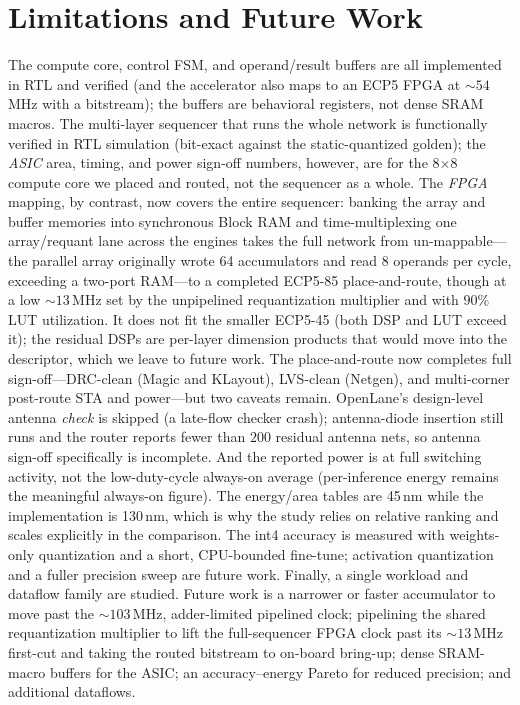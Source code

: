 \documentclass[conference]{IEEEtran}
\newcommand{\approxs}{\ensuremath{\sim}}
\begin{document}
\section{Limitations and Future Work}
The compute core, control FSM, and operand/result buffers are all implemented in
RTL and verified (and the accelerator also maps to an ECP5 FPGA at \approxs$54$\,MHz
with a bitstream); the buffers are behavioral registers, not dense SRAM macros.
The multi-layer sequencer that runs the whole network is functionally verified in
RTL simulation (bit-exact against the static-quantized golden); the \emph{ASIC}
area, timing, and power sign-off numbers, however, are for the 8$\times$8 compute
core we placed and routed, not the sequencer as a whole. The \emph{FPGA} mapping,
by contrast, now covers the entire sequencer: banking the array and buffer
memories into synchronous Block RAM and time-multiplexing one array/requant lane
across the engines takes the full network from un-mappable---the parallel array
originally wrote 64 accumulators and read 8 operands per cycle, exceeding a
two-port RAM---to a completed ECP5-85 place-and-route, though at a low
\approxs$13$\,MHz set by the unpipelined requantization multiplier and with $90\%$
LUT utilization. It does not fit the smaller ECP5-45 (both DSP and LUT exceed it);
the residual DSPs are per-layer dimension products that would move into the
descriptor, which we leave to future work.
The place-and-route now completes full sign-off---DRC-clean (Magic and KLayout),
LVS-clean (Netgen), and multi-corner post-route STA and power---but two caveats
remain. OpenLane's design-level antenna \emph{check} is skipped (a late-flow
checker crash); antenna-diode insertion still runs and the router reports fewer
than $200$ residual antenna nets, so antenna sign-off specifically is incomplete.
And the reported power is at full switching activity, not the low-duty-cycle
always-on average (per-inference energy remains the meaningful always-on figure).
The energy/area tables are 45\,nm while the implementation is 130\,nm, which is
why the study relies on relative ranking and scales explicitly in the comparison.
The int4 accuracy is measured with weights-only quantization and a short,
CPU-bounded fine-tune; activation quantization and a fuller precision sweep are
future work. Finally, a single workload and dataflow family are studied. Future
work is a narrower or faster accumulator to move past the \approxs$103$\,MHz,
adder-limited pipelined clock; pipelining the shared requantization multiplier to
lift the full-sequencer FPGA clock past its \approxs$13$\,MHz first-cut and taking
the routed bitstream to on-board bring-up; dense SRAM-macro buffers for the ASIC;
an accuracy--energy Pareto for reduced precision; and additional dataflows.
\end{document}
